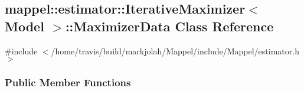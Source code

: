 \hypertarget{classmappel_1_1estimator_1_1IterativeMaximizer_1_1MaximizerData}{}\subsection{mappel\+:\+:estimator\+:\+:Iterative\+Maximizer$<$ Model $>$\+:\+:Maximizer\+Data Class Reference}
\label{classmappel_1_1estimator_1_1IterativeMaximizer_1_1MaximizerData}


{\ttfamily \#include $<$/home/travis/build/markjolah/\+Mappel/include/\+Mappel/estimator.\+h$>$}

\subsubsection*{Public Member Functions}
